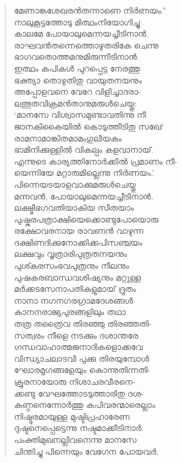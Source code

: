 \begin{verse}
മേണാങ്കശേഖരന്‍തന്നാണെ നിര്‍ണയം.”\\
നാലുകൂട്ടത്തോടു മിത്ഥംനിയോഗിച്ചു\\
കാലമേ പോയാലുമെന്നയച്ചീടിനാന്‍.\\
രാഘവന്‍തന്നെത്തൊഴുതരികേ ചെന്നു\\
ഭാഗവതൊത്തമനുമിരുന്നീടിനാന്‍.\\
ഇത്ഥം കപികള്‍ പുറപ്പെട്ട നേരത്തു\\
ഭക്ത്യാ തൊഴുതിതു വായുതനയനും\\
അപ്പോളവനെ വേറേ വിളിച്ചാദരാ-\\
ലത്ഭുതവിക്രമന്‍താനുമരുള്‍ചെയ്തു:\\
‘മാനസേ വിശ്വാസമുണ്ടാവതിന്നു നീ\\
ജാനകികൈയില്‍ കൊടുത്തീടിതു സഖേ!\\
രാമനാമാങ്കിതമാമംഗുലീയകം\\
ഭാമിനിക്കുള്ളില്‍ വികല്പം കളവാനായ്.\\
എന്നുടെ കാര്യത്തിനോര്‍ക്കില്‍ പ്രമാണം നീ-\\
യെന്നിയേ മറ്റാരുമില്ലെന്നു നിര്‍ണയം.’\\
പിന്നെയടയാളവാക്കുമരുള്‍ചെയ്തു\\
മന്നവന്‍, പോയാലുമെന്നയച്ചീടിനാന്‍.\\
ലക്ഷ്മീഭഗവതിയാകിയ സീതയാം\\
പുഷ്കരപത്രാക്ഷിയെക്കൊണ്ടുപോയൊരു\\
രക്ഷോവരനായ രാവണന്‍ വാഴുന്ന\\
ദക്ഷിണദിക്കുനോക്കിക്കപിസഞ്ചയം\\
ലക്ഷവും വൃത്രാരിപുത്രതനയനും\\
പുശ്കരസംഭവപുത്രനും നീലനും\\
പുഷകരബാന്ധവശിഷ്യനും മറ്റുള്ള\\
മര്‍ക്കടസേനാപതികളുമായ് ദ്രുതം\\
നാനാ നഗനഗരഗ്രാമദേശങ്ങള്‍\\
കാനനരാജ്യപുരങ്ങളിലും തഥാ\\
തത്ര തത്രൈവ തിരഞ്ഞു തിരഞ്ഞതി-\\
സത്വരം നീളെ നടക്കും ദശാന്തരേ\\
ഗന്ധവാഹാത്മജനാദികളൊക്കവേ\\
വിന്ധ്യാചലാടവി പുക്കു തിരയുമ്പോള്‍\\
ഘോരമൃഗങ്ങളേയും കൊന്നുതിന്നതി-\\
ക്രൂരനായോരു നിശാചരവീരനെ-\\
ക്കണ്ടു വേഘത്തോടടുത്താരിതു ദശ-\\
കണ്ഠനെന്നോര്‍ത്തു കപിവരന്മാരെല്ലാം\\
നിഷ്ഠുരമായുള്ള മുഷ്ടിപ്രഹാരേണ\\
ദുഷ്ടനെപ്പെട്ടെന്നു നഷ്ടമാക്കീടിനാര്‍.\\
പംക്തിമുഖനല്ലിവനെന്നു മാനസേ\\
ചിന്തിച്ചു പിന്നെയും വേഗേന പോയവര്‍.
\end{verse}

